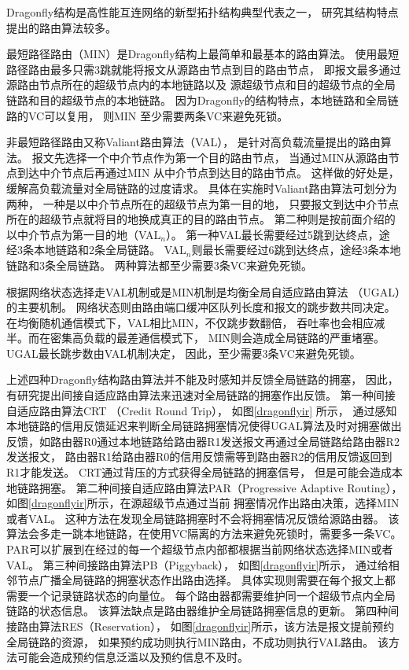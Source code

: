 Dragonfly结构是高性能互连网络的新型拓扑结构典型代表之一，
研究其结构特点提出的路由算法较多。

最短路径路由（MIN）是Dragonfly结构上最简单和最基本的路由算法。
使用最短路径路由最多只需3跳就能将报文从源路由节点到目的路由节点，
即报文最多通过源路由节点所在的超级节点内的本地链路以及
源超级节点和目的超级节点的全局链路和目的超级节点的本地链路。
因为Dragonfly的结构特点，本地链路和全局链路的VC可以复用，
则MIN 至少需要两条VC来避免死锁。

非最短路径路由又称Valiant路由算法（VAL），
是针对高负载流量提出的路由算法。
报文先选择一个中介节点作为第一个目的路由节点，
当通过MIN从源路由节点到达中介节点后再通过MIN 从中介节点到达目的路由节点。
这样做的好处是，缓解高负载流量对全局链路的过度请求。
具体在实施时Valiant路由算法可划分为两种，
一种是以中介节点所在的超级节点为第一目的地，
只要报文到达中介节点所在的超级节点就将目的地换成真正的目的路由节点。
第二种则是按前面介绍的以中介节点为第一目的地（VAL$_n$）。
第一种VAL最长需要经过5跳到达终点，途
经3条本地链路和2条全局链路。
VAL$_n$则最长需要经过6跳到达终点，途经3条本地链路和3条全局链路。
两种算法都至少需要3条VC来避免死锁。

根据网络状态选择走VAL机制或是MIN机制是均衡全局自适应路由算法
（UGAL）的主要机制。
网络状态则由路由端口缓冲区队列长度和报文的跳步数共同决定。
在均衡随机通信模式下，VAL相比MIN，不仅跳步数翻倍，
吞吐率也会相应减半。而在密集高负载的最差通信模式下，
MIN则会造成全局链路的严重堵塞。
UGAL最长跳步数由VAL机制决定，
因此，至少需要3条VC来避免死锁。

上述四种Dragonfly结构路由算法并不能及时感知并反馈全局链路的拥塞，
因此，有研究提出间接自适应路由算法来迅速对全局链路的拥塞作出反馈。
第一种间接自适应路由算法CRT （Credit Round Trip），
如图\ref{dragonflyir} 所示，
通过感知本地链路的信用反馈延迟来判断全局链路拥塞情况使得UGAL算法及时对拥塞做出
反馈，如路由器R0通过本地链路给路由器R1发送报文再通过全局链路给路由器R2发送报文，
路由器R1给路由器R0的信用反馈需等到路由器R2的信用反馈返回到R1才能发送。
CRT通过背压的方式获得全局链路的拥塞信号，
但是可能会造成本地链路拥塞。
第二种间接自适应路由算法PAR（Progressive Adaptive Routing），
如图\ref{dragonflyir}所示，在源超级节点通过当前
拥塞情况作出路由决策，选择MIN或者VAL。
这种方法在发现全局链路拥塞时不会将拥塞情况反馈给源路由器。
该算法会多走一跳本地链路，在使用VC隔离的方法来避免死锁时，需要多一条VC。
PAR可以扩展到在经过的每一个超级节点内部都根据当前网络状态选择MIN或者VAL。
第三种间接路由算法PB（Piggyback），
如图\ref{dragonflyir}所示，
通过给相邻节点广播全局链路的拥塞状态作出路由选择。
具体实现则需要在每个报文上都需要一个记录链路状态的向量位。
每个路由器都需要维护同一个超级节点内全局链路的状态信息。
该算法缺点是路由器维护全局链路拥塞信息的更新。
第四种间接路由算法RES（Reservation），
如图\ref{dragonflyir}所示，该方法是报文提前预约全局链路的资源，
如果预约成功则执行MIN路由，不成功则执行VAL路由。
该方法可能会造成预约信息泛滥以及预约信息不及时。

